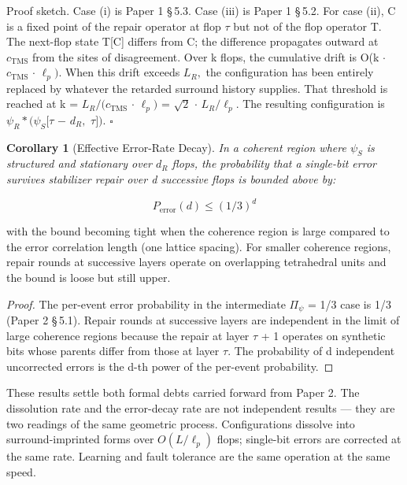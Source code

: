 \documentclass[11pt,oneside]{report}
\newtheorem{corollary}[theorem]{Corollary}
\theoremstyle{definition}
\theoremstyle{remark}
\begin{document}
Proof sketch. Case (i) is Paper 1 \S\,5.3. Case (iii) is Paper 1 \S\,5.2. For
case (ii), C is a fixed point of the repair operator at flop \ensuremath{\tau} but not
of the flop operator T. The next-flop state T[C] differs from C; the
difference propagates outward at \ensuremath{c_{\mathrm{TMS}}} from the sites of disagreement.
Over k flops, the cumulative drift is O(k \ensuremath{\cdot} \ensuremath{c_{\mathrm{TMS}}} \ensuremath{\cdot} \ensuremath{\ell_{p}).} When this drift
exceeds \ensuremath{L_{R},} the configuration has been entirely replaced by whatever
the retarded surround history supplies. That threshold is reached at k =
\ensuremath{L_{R}/(c_{\mathrm{TMS}}} \ensuremath{\cdot} \ensuremath{\ell_{p})} = \ensuremath{\sqrt{2}} \ensuremath{\cdot} \ensuremath{L_{R}/\ell_{p}.} The resulting configuration is
\ensuremath{\psi_{R}*(\psi_{S}}\textbar\ensuremath{[\tau} \ensuremath{-} \ensuremath{d_{R},} \ensuremath{\tau ]).} \hfill\ensuremath{\square}

\begin{corollary}[Effective Error-Rate Decay]
In a coherent region where \ensuremath{\psi_{S}}
is structured and stationary over \ensuremath{d_{R}} flops, the probability that a
single-bit error survives stabilizer repair over d successive flops is
bounded above by:
\end{corollary}

\begin{equation*}
P_{\mathrm{error}}(d) \leq (1/3)^{d}
\end{equation*}

with the bound becoming tight when the coherence region is large
compared to the error correlation length (one lattice spacing). For
smaller coherence regions, repair rounds at successive layers operate on
overlapping tetrahedral units and the bound is loose but still upper.

\begin{proof}
The per-event error probability in the intermediate
\textbar \ensuremath{\Pi_{\psi}}\textbar{} = 1/3 case is 1/3 (Paper 2 \S\,5.1). Repair rounds
at successive layers are independent in the limit of large coherence
regions because the repair at layer \ensuremath{\tau} + 1 operates on synthetic bits
whose parents differ from those at layer \ensuremath{\tau .} The probability of d
independent uncorrected errors is the d-th power of the per-event
probability.

\end{proof}

These results settle both formal debts carried forward from Paper 2. The
dissolution rate and the error-decay rate are not independent results
--- they are two readings of the same geometric process. Configurations
dissolve into surround-imprinted forms over \ensuremath{O(L/\ell_{p})} flops; single-bit
errors are corrected at the same rate. Learning and fault tolerance are
the same operation at the same speed.
\end{document}
